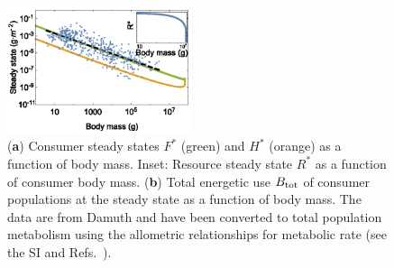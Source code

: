 \documentclass[twocolumn,preprintnumbers,amsmath,amssymb,superscriptaddress]{revtex4}
\begin{document}
\begin{figure}
\centering
\includegraphics[width=0.48\textwidth]{fig_FPAllometric2.eps}
\caption{\small{ ({\bf a}) Consumer steady states $F^*$ (green) and $H^*$ (orange) as a function of
  body mass. Inset: Resource steady state $R^*$ as a function of consumer body mass.
  ({\bf b}) Total energetic use $B_{\rm tot}$ of consumer populations at the steady state as a function of body mass.
  The data are from Damuth \citep{Damuth:1987kr} and have been converted to
  total population metabolism using the allometric relationships for
  metabolic rate (see the SI and Refs.~\citep{West:2001bv,hou,moses2008rmo}).}\label{fig:mass}}
\end{figure}
\end{document}
